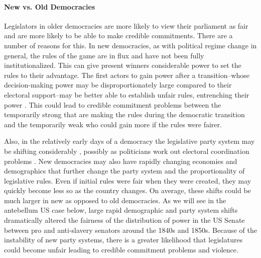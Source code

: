 \documentclass[a4paper]{article}\usepackage[]{graphicx}\usepackage[]{color}
\begin{document}
\paragraph{New vs. Old Democracies}

Legislators in older democracies are more likely to view their parliament as fair and are more likely to be able to make credible commitments. There are a number of reasons for this. In new democracies, as with political regime change in general, the rules of the game are in flux and have not been fully institutionalized. This can give present winners considerable power to set the rules to their advantage. The first actors to gain power after a transition--whose decision-making power may be disproportionately large compared to their electoral support--may be better able to establish unfair rules, entrenching their power \cite[108]{Saideman2002}. This could lead to credible commitment problems between the temporarily strong that are making the rules during the democratic transition and the temporarily weak who could gain more if the rules were fairer. 

Also, in the relatively early days of a democracy the legislative party system may be shifting considerably \cite[see][161 for a review]{Mainwaring2007b}, possibly as politicians work out electoral coordination problems \citep[e.g.][]{cox1997}. New democracies may also have rapidly changing economies and demographics that further change the party system and the proportionality of legislative rules. Even if initial rules were fair when they were created, they may quickly become less so as the country changes. On average, these shifts could be much larger in new as opposed to old democracies. As we will see in the antebellum US case below, large rapid demographic and party system shifts dramatically altered the fairness of the distribution of power in the US Senate between pro and anti-slavery senators around the 1840s and 1850s. Because of the instability of new party systems, there is a greater likelihood that legislatures could become unfair leading to credible commitment problems and violence.
\end{document}
